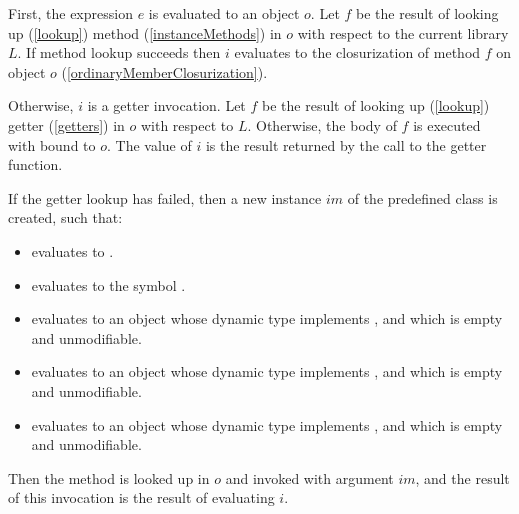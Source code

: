 \documentclass[makeidx]{article}
\begin{document}
{\LMHash{}%
First, the expression $e$ is evaluated to an object $o$.
Let $f$ be the result of looking up (\ref{lookup}) method
(\ref{instanceMethods})
\id{} in $o$ with respect to the current library $L$.
If method lookup succeeds then $i$ evaluates to
the closurization of method $f$ on object $o$
(\ref{ordinaryMemberClosurization}).


\LMHash{}%
Otherwise, $i$ is a getter invocation.
Let $f$ be the result of looking up (\ref{lookup}) getter
(\ref{getters})
\id{} in $o$ with respect to $L$.
Otherwise, the body of $f$ is executed with \THIS{} bound to $o$.
The value of $i$ is the result returned by the call to the getter function.

\LMHash{}%
If the getter lookup has failed,
then a new instance $im$ of the predefined class  is created, such that:
\begin{itemize}
\item {} evaluates to \TRUE.
\item {} evaluates to the symbol .
\item {} evaluates to an object
  whose dynamic type implements ,
  and which is empty and unmodifiable.
\item {} evaluates to an object
  whose dynamic type implements ,
  and which is empty and unmodifiable.
\item {} evaluates to an object
  whose dynamic type implements ,
  and which is empty and unmodifiable.
\end{itemize}

\LMHash{}%
Then the method  is looked up in $o$ and invoked with argument $im$,
and the result of this invocation is the result of evaluating $i$.



}
\end{document}
